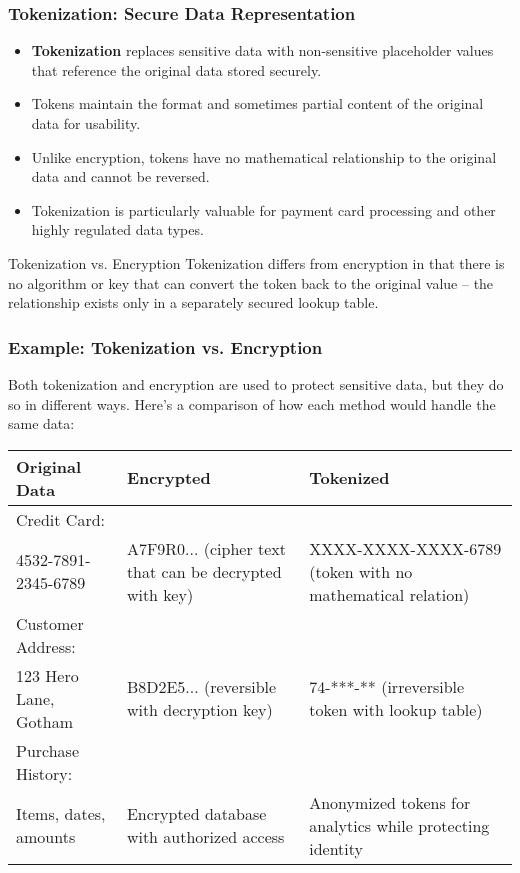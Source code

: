 \documentclass{beamer}
\begin{document}
\begin{frame}
\frametitle{Tokenization: Secure Data Representation}
\begin{itemize}
    \item \textbf{Tokenization} replaces sensitive data with non-sensitive placeholder values that reference the original data stored securely.
    \item Tokens maintain the format and sometimes partial content of the original data for usability.
    \item Unlike encryption, tokens have no mathematical relationship to the original data and cannot be reversed.
    \item Tokenization is particularly valuable for payment card processing and other highly regulated data types.
\end{itemize}

\begin{alertblock}{Tokenization vs. Encryption}
Tokenization differs from encryption in that there is no algorithm or key that can convert the token back to the original value – the relationship exists only in a separately secured lookup table.
\end{alertblock}
\end{frame}


\begin{frame}
    \frametitle{Example: Tokenization vs. Encryption}
    Both tokenization and encryption are used to protect sensitive data, but they do so in different ways. 
    Here’s a comparison of how each method would handle the same data:
    \vspace{.5cm}

    \scriptsize
    \begin{tabular}{|p{3.5cm}|p{3.5cm}|p{3.5cm}|}
    \hline
    \textbf{Original Data} & \textbf{Encrypted} & \textbf{Tokenized} \\
    \hline
    Credit Card: \\4532-7891-2345-6789 & A7F9R0... (cipher text that can be decrypted with key) & XXXX-XXXX-XXXX-6789 (token with no mathematical relation) \\
    \hline
    Customer Address: \\123 Hero Lane, Gotham & B8D2E5... (reversible with decryption key) & 74-***-** (irreversible token with lookup table) \\
    \hline
    Purchase History: \\Items, dates, amounts & Encrypted database with authorized access & Anonymized tokens for analytics while protecting identity \\
    \hline
    \end{tabular}
    
    \end{frame}
\end{document}

